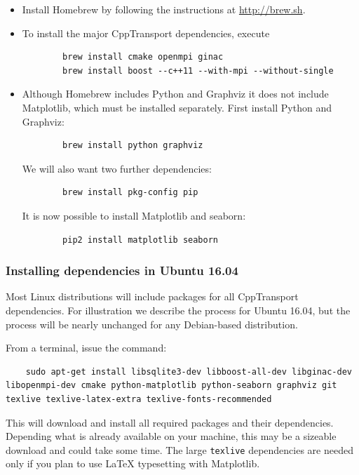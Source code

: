 \documentclass[11pt,a4paper]{article}
\newcommand{\packagefont}{\sffamily}
\newcommand{\CppTransport}{{\packagefont CppTransport}}
\newcommand{\Python}{{\packagefont Python}}
\newcommand{\Matplotlib}{{\packagefont Matplotlib}}
\newcommand{\seaborn}{{\packagefont seaborn}}
\newcommand{\Homebrew}{{\packagefont Homebrew}}
\newcommand{\Graphviz}{{\packagefont Graphviz}}
\begin{document}
\begin{itemize}
    \item Install {\Homebrew} by following the instructions at
    \url{http://brew.sh}.
    
    \item To install the major {\CppTransport} dependencies, execute
    \begin{verbatim}
        brew install cmake openmpi ginac
        brew install boost --c++11 --with-mpi --without-single 
    \end{verbatim}

    \item Although {\Homebrew} includes {\Python} and {\Graphviz} it does not
    include {\Matplotlib}, which must be installed separately.
    First install {\Python} and {\Graphviz}:
    \begin{verbatim}
        brew install python graphviz    
    \end{verbatim}
    We will also want two further dependencies:
    \begin{verbatim}
        brew install pkg-config pip    
    \end{verbatim}
    It is now possible to install {\Matplotlib} and {\seaborn}:
    \begin{verbatim}
        pip2 install matplotlib seaborn    
    \end{verbatim}

\end{itemize}

\subsubsection{Installing dependencies in Ubuntu 16.04}
Most Linux distributions will include packages for all
{\CppTransport} dependencies. For illustration we describe the process for
Ubuntu 16.04, but the process will be nearly unchanged for any
Debian-based distribution.

From a terminal, issue the command:
\begin{verbatim}
    sudo apt-get install libsqlite3-dev libboost-all-dev libginac-dev libopenmpi-dev cmake python-matplotlib python-seaborn graphviz git texlive texlive-latex-extra texlive-fonts-recommended
\end{verbatim}
This will download and install all required packages and their dependencies.
Depending what is already available on your machine, this may be a sizeable
download and could take some time.
The large \texttt{texlive} dependencies are needed only if you plan to
use {\LaTeX} typesetting with {\Matplotlib}.
\end{document}
